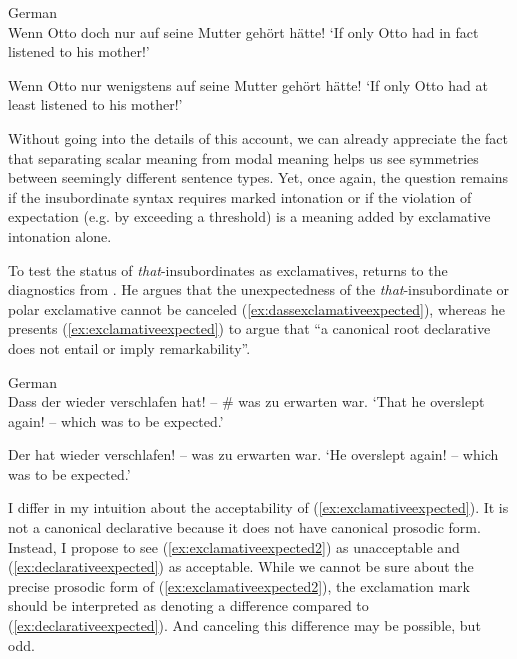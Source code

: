 \begin{exe}
	\ex German\label{ex:wennnuroptative} \\
		Wenn Otto doch nur auf seine Mutter gehört hätte!
	\glt `If only Otto had in fact listened to his mother!'
	
	\ex \label{ex:wennwenigstensexclamative}
		 Wenn Otto nur wenigstens auf seine Mutter gehört hätte!
	\glt `If only Otto had at least listened to his mother!' 
\end{exe}

Without going into the details of this account, we can already appreciate the fact that separating scalar meaning from modal meaning helps us see symmetries between seemingly different sentence types. Yet, once again, the question remains if the insubordinate syntax requires marked intonation or if the violation of expectation (e.g. by exceeding a threshold) is a meaning added by exclamative intonation alone.
 
To test the status of \textit{that}-insubordinates as exclamatives, \citet[27]{Grosz.2012} returns to the diagnostics from \citet{ZanuttiniPortner2003}. He argues that the unexpectedness of the \textit{that}-insubordinate or polar exclamative cannot be canceled (\ref{ex:dassexclamativeexpected}), whereas he presents (\ref{ex:exclamativeexpected}) to argue that ``a canonical root declarative does not entail or imply remarkability''.

\begin{exe} 
	\ex German\label{ex:dassexclamativeexpected} \\
		 Dass der wieder verschlafen hat! – \# was zu erwarten war. 
	\glt `That he overslept again! – which was to be expected.'
	
	\ex \label{ex:exclamativeexpected}
		 Der hat wieder verschlafen! – was zu erwarten war.
	\glt `He overslept again! – which was to be expected.' 
\end{exe}

I differ in my intuition about the acceptability of (\ref{ex:exclamativeexpected}). It is not a canonical declarative because it does not have canonical prosodic form. Instead, I propose to see (\ref{ex:exclamativeexpected2}) as unacceptable and (\ref{ex:declarativeexpected}) as acceptable. While we cannot be sure about the precise prosodic form of (\ref{ex:exclamativeexpected2}), the exclamation mark should be interpreted as denoting a difference compared to (\ref{ex:declarativeexpected}). And canceling this difference may be possible, but odd.

